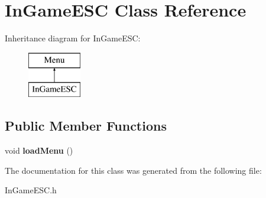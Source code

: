 \hypertarget{class_in_game_e_s_c}{}\section{In\+Game\+E\+S\+C Class Reference}
\label{class_in_game_e_s_c}
Inheritance diagram for In\+Game\+E\+S\+C\+:\begin{figure}[H]
\begin{center}
\leavevmode
\includegraphics[height=2.000000cm]{class_in_game_e_s_c}
\end{center}
\end{figure}
\subsection*{Public Member Functions}
\begin{DoxyCompactItemize}
\item 
\hypertarget{class_in_game_e_s_c_a4c24f8fea1f4d4d917eeb3ed16a42a9d}{}void {\bfseries load\+Menu} ()\label{class_in_game_e_s_c_a4c24f8fea1f4d4d917eeb3ed16a42a9d}

\end{DoxyCompactItemize}


The documentation for this class was generated from the following file\+:\begin{DoxyCompactItemize}
\item 
In\+Game\+E\+S\+C.\+h\end{DoxyCompactItemize}
